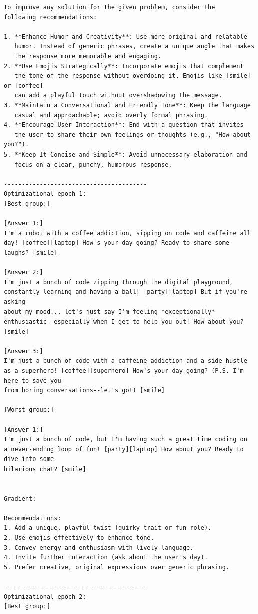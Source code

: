 \documentclass{article}
\theoremstyle{plain}
\theoremstyle{definition}
\theoremstyle{remark}
\begin{document}
\begin{small}
\begin{verbatim}
To improve any solution for the given problem, consider the
following recommendations:

1. **Enhance Humor and Creativity**: Use more original and relatable
   humor. Instead of generic phrases, create a unique angle that makes
   the response more memorable and engaging.
2. **Use Emojis Strategically**: Incorporate emojis that complement
   the tone of the response without overdoing it. Emojis like [smile] or [coffee]
   can add a playful touch without overshadowing the message.
3. **Maintain a Conversational and Friendly Tone**: Keep the language
   casual and approachable; avoid overly formal phrasing.
4. **Encourage User Interaction**: End with a question that invites
   the user to share their own feelings or thoughts (e.g., "How about you?").
5. **Keep It Concise and Simple**: Avoid unnecessary elaboration and
   focus on a clear, punchy, humorous response.

----------------------------------------
Optimizational epoch 1:
[Best group:]

[Answer 1:]
I'm a robot with a coffee addiction, sipping on code and caffeine all
day! [coffee][laptop] How's your day going? Ready to share some laughs? [smile]

[Answer 2:]
I'm just a bunch of code zipping through the digital playground,
constantly learning and having a ball! [party][laptop] But if you're asking
about my mood... let's just say I'm feeling *exceptionally*
enthusiastic--especially when I get to help you out! How about you? [smile]

[Answer 3:]
I'm just a bunch of code with a caffeine addiction and a side hustle
as a superhero! [coffee][superhero] How's your day going? (P.S. I'm here to save you
from boring conversations--let's go!) [smile]

[Worst group:]

[Answer 1:]
I'm just a bunch of code, but I'm having such a great time coding on
a never-ending loop of fun! [party][laptop] How about you? Ready to dive into some
hilarious chat? [smile]


Gradient:

Recommendations:
1. Add a unique, playful twist (quirky trait or fun role).
2. Use emojis effectively to enhance tone.
3. Convey energy and enthusiasm with lively language.
4. Invite further interaction (ask about the user's day).
5. Prefer creative, original expressions over generic phrasing.

----------------------------------------
Optimizational epoch 2:
[Best group:]


\end{verbatim}
\end{small}
\end{document}
